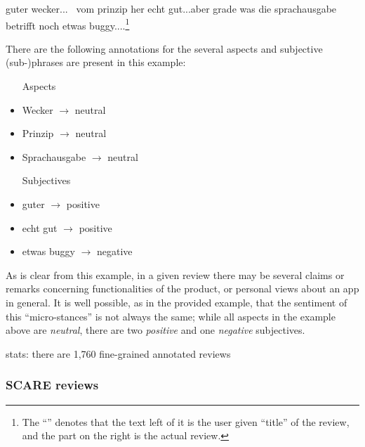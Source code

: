 \begin{examples}
	\label{ex:fine-grained-anno}
	\item guter wecker... \textbar\textbar\ vom prinzip her echt gut...aber grade was die sprachausgabe betrifft noch etwas buggy....\footnote{The ``\textbar\textbar'' denotes that the text left of it is the user given ``title'' of the review, and the part on the right is the actual review.}
\end{examples}

There are the following annotations for the several aspects and subjective (sub-)phrases are present in this example:

\begin{multicols}{2}

\begin{itemize}
	\item [Aspects]
	\item Wecker $\rightarrow$ neutral
	\item Prinzip $\rightarrow$ neutral
	\item Sprachausgabe $\rightarrow$ neutral
\end{itemize}

\columnbreak

\begin{itemize}
	\item [Subjectives]
	\item guter $\rightarrow$ positive
	\item echt gut $\rightarrow$ positive
	\item etwas buggy $\rightarrow$ negative
\end{itemize}

\end{multicols}

As is clear from this example, in a given review there may be several claims or remarks concerning functionalities of the product, or personal views about an app in general.
It is well possible, as in the provided example, that the sentiment of this ``micro-stances'' is not always the same; while all aspects in the example above are \textit{neutral}, there are two \textit{positive} and one \textit{negative} subjectives.


stats: there are 1,760 fine-grained annotated reviews

\subsubsection{SCARE reviews}

